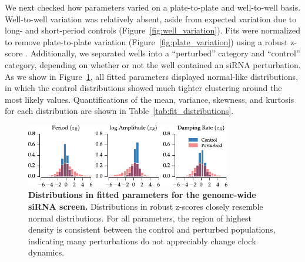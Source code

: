 \documentclass[11pt, letterpaper]{article}
\begin{document}
We next checked how parameters varied on a plate-to-plate and well-to-well basis.
Well-to-well variation was relatively absent, aside from expected variation due to long- and short-period controls (Figure~\ref{fig:well_variation}).
Fits were normalized to remove plate-to-plate variation (Figure~\ref{fig:plate_variation}) using a robust z-score \cite{Birmingham2009}.
Additionally, we separated wells into a ``perturbed'' category and ``control'' category, depending on whether or not the well contained an siRNA perturbation.
As we show in Figure~\ref{fig:fit_distributions}, all fitted parameters displayed normal-like distributions, in which the control distributions showed much tighter clustering around the most likely values.
Quantifications of the mean, variance, skewness, and kurtosis for each distribution are shown in Table~\ref{tab:fit_distributions}.

\begin{figure}[tbp]
  \begin{center}
    \includegraphics[width=0.8\textwidth]{figures/pdfs/fitted_parameters.pdf}
  \end{center}
  \caption{{\bfseries Distributions in fitted parameters for the genome-wide siRNA screen.} Distributions in robust z-scores closely resemble normal distributions. For all parameters, the region of highest density is consistent between the control and perturbed populations, indicating many perturbations do not appreciably change clock dynamics. } 
\label{fig:fit_distributions}
\end{figure}
\end{document}
